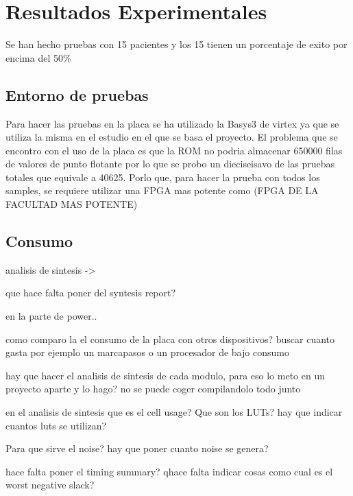 \chapter{Resultados Experimentales}
	Se han hecho pruebas con 15 pacientes y los 15 tienen un porcentaje de exito por encima del 50\%


\section{Entorno de pruebas}
Para hacer las pruebas en la placa se ha utilizado la Basys3 de virtex ya que se utiliza la misma en el estudio en el que se basa el proyecto.
El problema que se encontro con el uso de la placa es que la ROM no podria almacenar 650000 filas de valores de punto flotante por lo que se probo un dieciseisavo de las pruebas totales que equivale a 40625.
Porlo que, para hacer la prueba con todos los samples, se requiere utilizar una FPGA mas potente como (FPGA DE LA FACULTAD MAS POTENTE) 
\section{Consumo}
	analisis de sintesis ->
	
	que hace falta poner del syntesis report?

	en la parte de power..

	como comparo la el consumo de la placa con otros dispositivos? buscar cuanto gasta por ejemplo un marcapasos o un procesador de bajo consumo

	hay que hacer el analisis de sintesis de cada modulo, para eso lo meto en un proyecto aparte y lo hago? no se puede coger compilandolo todo junto

	en el analisis de sintesis que es el cell usage? Que son los LUTs? hay que indicar cuantos luts se utilizan?

	Para que sirve el noise? hay que poner cuanto noise se genera?

	hace falta poner el timing summary? qhace falta indicar cosas como cual es el worst negative slack?

	